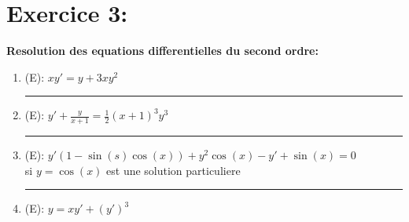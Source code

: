 \documentclass[a4paper,12pt]{article}
\begin{document}

\section*{Exercice 3:}
\textbf{Resolution des equations differentielles du second ordre:}

\begin{enumerate}
	\vspace{1cm}
	\item (E): $xy' = y + 3xy^2$ \\
	
	
	\vspace{1cm}
	\hrule
	\vspace{1cm}
	
	\item (E): $y' + \frac{y}{x+1} = \frac{1}{2} (x+1)^3 y^3$ \\
	
	
	\vspace{1cm}
	\hrule
	\vspace{1cm}
	
	\item (E): $y' (1 -\sin(s)\cos(x)) + y^2\cos(x) -y' + \sin(x) = 0$ \\ si $y = \cos(x)$ est une solution particuliere
	
	
	\vspace{1cm}
	\hrule
	\vspace{1cm}
	
	\item (E): $y = xy' + (y')^3$
	 \\
	
	\vspace{1cm}
\end{enumerate}
\end{document}
